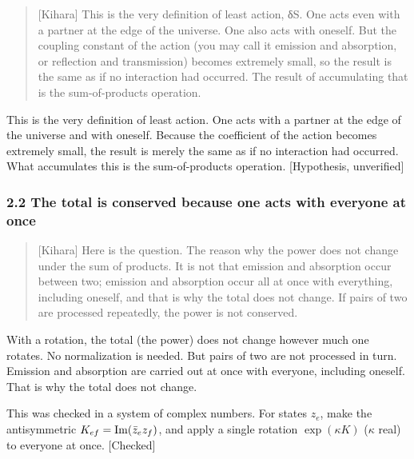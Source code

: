 \documentclass[
  a4paper,
]{article}
\begin{document}
\begin{quote}
{[}Kihara{]} This is the very definition of least action, δS. One acts
even with a partner at the edge of the universe. One also acts with
oneself. But the coupling constant of the action (you may call it
emission and absorption, or reflection and transmission) becomes
extremely small, so the result is the same as if no interaction had
occurred. The result of accumulating that is the sum-of-products
operation.
\end{quote}

This is the very definition of least action. One acts with a partner at
the edge of the universe and with oneself. Because the coefficient of
the action becomes extremely small, the result is merely the same as if
no interaction had occurred. What accumulates this is the
sum-of-products operation. {[}Hypothesis, unverified{]}

\subsubsection{2.2 The total is conserved because one acts with everyone
at
once}\label{the-total-is-conserved-because-one-acts-with-everyone-at-once}

\begin{quote}
{[}Kihara{]} Here is the question. The reason why the power does not
change under the sum of products. It is not that emission and absorption
occur between two; emission and absorption occur all at once with
everything, including oneself, and that is why the total does not
change. If pairs of two are processed repeatedly, the power is not
conserved.
\end{quote}

With a rotation, the total (the power) does not change however much one
rotates. No normalization is needed. But pairs of two are not processed
in turn. Emission and absorption are carried out at once with everyone,
including oneself. That is why the total does not change.

This was checked in a system of complex numbers. For states \(z_e\),
make the antisymmetric \(K_{ef} = {\rm Im}(\bar z_e z_f)\), and apply a
single rotation \(\exp(\kappa K)\) (\(\kappa\) real) to everyone at
once. {[}Checked{]}
\end{document}
